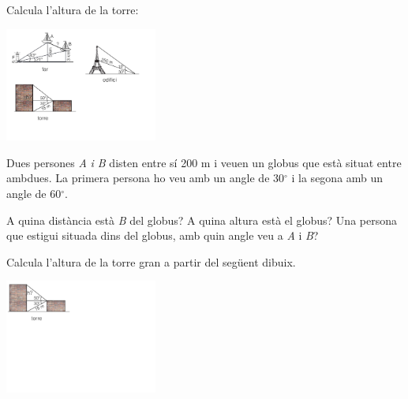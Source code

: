 \begin{mylist}
	\exer
	Calcula l'altura de la torre: 
	\begin{center}
		\vspace{-1cm}
		\includegraphics[width=5cm]{img-03/edifici}
	\end{center}

	
	\exer
	Dues persones \emph{A} \emph{i B} disten entre sí 200 m i veuen un
	globus que està situat entre ambdues. La primera persona ho veu amb un
	angle de 30${}^\circ$ i la segona amb un angle de 60${}^\circ$.
	
	\begin{tasks}
		\task
		A quina distància està \emph{B} del globus?
		\task
		A quina altura està el globus?
		\task
		Una persona que estigui situada dins del globus, amb quin angle veu
		a \emph{A} i \emph{B}?
	\end{tasks}
\answers[cols=3]{[100 m, 86.60 m, 90$^\circ$]}
	
	\exer
	\begin{minipage}[t]{0.55\textwidth}
		Calcula l'altura de la torre gran a partir del següent dibuix.
	\end{minipage}\hfill
	\begin{minipage}[t]{5.5cm}
		\vspace{-\baselineskip}
		\includegraphics[width=5cm]{img-03/torre}
	\end{minipage}

	

\end{mylist}
